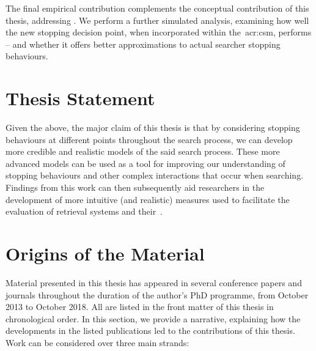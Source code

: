  The final empirical contribution complements the conceptual contribution of this thesis, addressing . We perform a further simulated analysis, examining how well the new stopping decision point, when incorporated within the~\gls{acr:csm}, performs -- and whether it offers better approximations to actual searcher stopping behaviours.

\section{Thesis Statement}
Given the above, the major claim of this thesis is that by considering stopping behaviours at different points throughout the search process, we can develop more credible and realistic models of the said search process. These more advanced models can be used as a tool for improving our understanding of stopping behaviours and other complex interactions that occur when searching. Findings from this work can then subsequently aid researchers in the development of more intuitive (and realistic) measures used to facilitate the evaluation of retrieval systems and their~.

%

\section{Origins of the Material}
Material presented in this thesis has appeared in several conference papers and journals throughout the duration of the author's PhD programme, from October 2013 to October 2018. All are listed in the front matter of this thesis in chronological order. In this section, we provide a narrative, explaining how the developments in the listed publications led to the contributions of this thesis. Work can be considered over three main strands:

